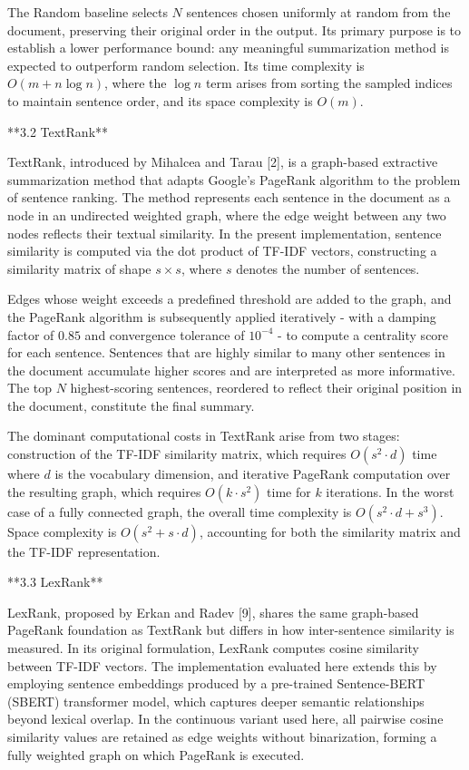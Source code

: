 \documentclass[10pt]{book}
\begin{document}
The Random baseline selects $N$ sentences chosen uniformly at random from the document, preserving their original order in the output. Its primary purpose is to establish a lower performance bound: any meaningful summarization method is expected to outperform random selection. Its time complexity is $O(m + n \log n)$, where the $\log n$ term arises from sorting the sampled indices to maintain sentence order, and its space complexity is $O(m)$.

**3.2 TextRank**

TextRank, introduced by Mihalcea and Tarau [2], is a graph-based extractive summarization method that adapts Google's PageRank algorithm to the problem of sentence ranking. The method represents each sentence in the document as a node in an undirected weighted graph, where the edge weight between any two nodes reflects their textual similarity. In the present implementation, sentence similarity is computed via the dot product of TF-IDF vectors, constructing a similarity matrix of shape $s \times s$, where $s$ denotes the number of sentences.

Edges whose weight exceeds a predefined threshold are added to the graph, and the PageRank algorithm is subsequently applied iteratively - with a damping factor of $0.85$ and convergence tolerance of $10^{-4}$ - to compute a centrality score for each sentence. Sentences that are highly similar to many other sentences in the document accumulate higher scores and are interpreted as more informative. The top $N$ highest-scoring sentences, reordered to reflect their original position in the document, constitute the final summary.

The dominant computational costs in TextRank arise from two stages: construction of the TF-IDF similarity matrix, which requires $O(s^2 \cdot d)$ time where $d$ is the vocabulary dimension, and iterative PageRank computation over the resulting graph, which requires $O(k \cdot s^2)$ time for $k$ iterations. In the worst case of a fully connected graph, the overall time complexity is $O(s^2 \cdot d + s^3)$. Space complexity is $O(s^2 + s \cdot d)$, accounting for both the similarity matrix and the TF-IDF representation.

**3.3 LexRank**

LexRank, proposed by Erkan and Radev [9], shares the same graph-based PageRank foundation as TextRank but differs in how inter-sentence similarity is measured. In its original formulation, LexRank computes cosine similarity between TF-IDF vectors. The implementation evaluated here extends this by employing sentence embeddings produced by a pre-trained Sentence-BERT (SBERT) transformer model, which captures deeper semantic relationships beyond lexical overlap. In the continuous variant used here, all pairwise cosine similarity values are retained as edge weights without binarization, forming a fully weighted graph on which PageRank is executed.
\end{document}
